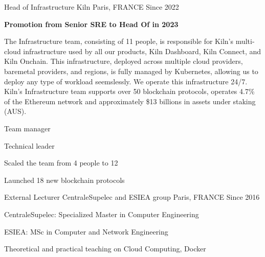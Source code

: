 

\begin{cventries}
\cventry
    {Head of Infrastructure} %
    {Kiln} %
    {Paris, FRANCE} %
    {Since 2022} %
    {
      \begin{cvitems} %
      \item {\textbf{Promotion from Senior SRE to Head Of in 2023}}
      \item {The Infrastructure team, consisting of 11 people, is responsible
        for Kiln's multi-cloud infrastructure used by all our products, Kiln
          Dashboard, Kiln Connect, and Kiln Onchain. This infrastructure,
          deployed across multiple cloud providers, baremetal providers, and
          regions, is fully managed by Kubernetes, allowing us to deploy any
          type of workload seemslessly. We operate this infrastructure 24/7.
          Kiln's Infrastructure team supports over 50 blockchain protocols,
          operates 4.7\% of the Ethereum network and approximately \$13
          billions in assets under staking (AUS).}
        \item {Team manager}
        \item {Technical leader}
        \item {Scaled the team from 4 people to 12}
        \item {Launched 18 new blockchain protocols}
      \end{cvitems}
    }
  \cventry
    {External Lecturer} %
    {CentraleSupelec and ESIEA group}
    {Paris, FRANCE} %
    {Since 2016} %
    {
      \begin{cvitems} %
        \item {CentraleSupelec: Specialized Master in Computer Engineering}
        \item {ESIEA: MSc in Computer and Network Engineering}
        \item {Theoretical and practical teaching on Cloud Computing, Docker
}
\end{cvitems}}
\end{cventries}
